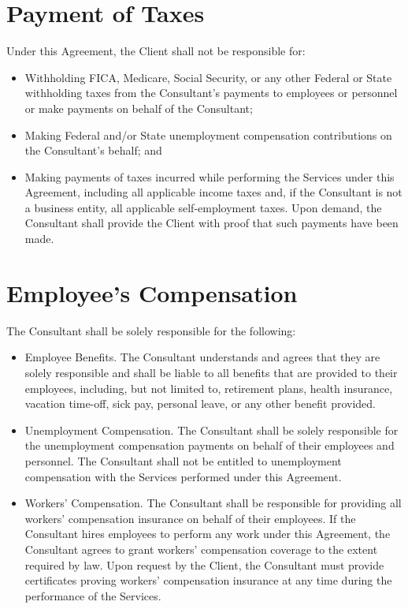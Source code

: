 \documentclass{article}
\begin{document}
\section{Payment of Taxes}

Under this Agreement, the Client shall not be responsible for:
\begin{itemize}
    \item Withholding FICA, Medicare, Social Security, or any other Federal or State withholding taxes from the Consultant's payments to employees or personnel or make payments on behalf of the Consultant;
    \item Making Federal and/or State unemployment compensation contributions on the Consultant's behalf; and
    \item Making payments of taxes incurred while performing the Services under this Agreement, including all applicable income taxes and, if the Consultant is not a business entity, all applicable self-employment taxes. Upon demand, the Consultant shall provide the Client with proof that such payments have been made.
\end{itemize}

\section{Employee's Compensation}

The Consultant shall be solely responsible for the following:
\begin{itemize}
    \item Employee Benefits. The Consultant understands and agrees that they are solely responsible and shall be liable to all benefits that are provided to their employees, including, but not limited to, retirement plans, health insurance, vacation time-off, sick pay, personal leave, or any other benefit provided.
    \item Unemployment Compensation. The Consultant shall be solely responsible for the unemployment compensation payments on behalf of their employees and personnel. The Consultant shall not be entitled to unemployment compensation with the Services performed under this Agreement.
    \item Workers’ Compensation. The Consultant shall be responsible for providing all workers' compensation insurance on behalf of their employees. If the Consultant hires employees to perform any work under this Agreement, the Consultant agrees to grant workers' compensation coverage to the extent required by law. Upon request by the Client, the Consultant must provide certificates proving workers' compensation insurance at any time during the performance of the Services.
\end{itemize}
\end{document}
